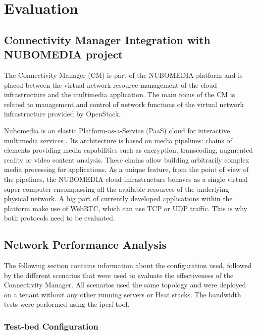 \chapter{Evaluation}


\section{Connectivity Manager Integration with NUBOMEDIA project}


The Connectivity Manager (CM) is part of the NUBOMEDIA platform and is placed between the virtual network resource management of the cloud infrastructure and the
multimedia application. The main focus of the CM is related to management and control of network functions of the virtual network infrastructure provided by OpenStack.

Nubomedia is an elastic Platform-as-a-Service (PaaS) cloud for interactive multimedia services \cite{nubomedia}. Its architecture is based on media pipelines: chains of elements providing media capabilities such as encryption, transcoding, augmented reality or video content analysis. These chains allow building arbitrarily complex media processing for applications. As a unique feature, from the point of view of the pipelines, the NUBOMEDIA cloud infrastructure behaves as a single virtual super-computer encompassing all the available resources of the underlying physical network. A big part of currently developed applications within the platform make use of WebRTC, which can use TCP or UDP traffic. This is why both protocols need to be evaluated.

\section{Network Performance Analysis}

The following section contains information about the configuration used, followed by the different scenarios that were used to evaluate the effectiveness of the Connectivity Manager. All scenarios used the same topology and were deployed on a tenant without any other running servers or Heat stacks. The bandwidth tests were performed using the iperf tool.

\newpage
\subsection{Test-bed Configuration}


